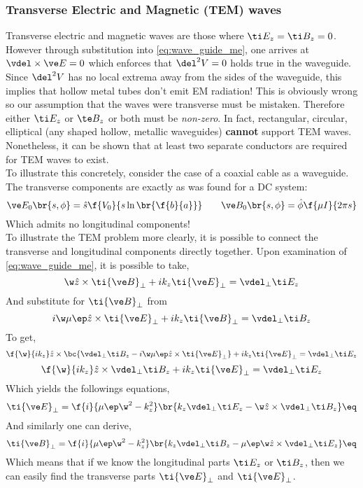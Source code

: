 \documentclass{article}
\begin{document}
\subsubsection{Transverse Electric and Magnetic (TEM) waves}

Transverse electric and magnetic waves are those where $\ti E_z = \ti B_z = 0$. However through substitution into \cref{eq:wave_guide_me}, one arrives at $\vdel \times \ve E = 0$ which enforces that $\del^2 V = 0$ holds true in the waveguide. Since $\del^2 V$ has no local extrema away from the sides of the waveguide, this implies that hollow metal tubes don't emit EM radiation! This is obviously wrong so our assumption that the waves were transverse must be mistaken. Therefore either $\ti E_z$ or $\te B_z$ or both must be \textit{non-zero}. In fact, rectangular, circular, elliptical (any shaped hollow, metallic waveguides) \textbf{cannot} support TEM waves. Nonetheless, it can be shown that at least two separate conductors are required for TEM waves to exist. \\

To illustrate this concretely, consider the case of a coaxial cable as a waveguide. The transverse components are exactly as was found for a DC system:
\[ \ve E_{0}\br{s, \phi} = \hat s \f{V_0}{s \ln \br{\f{b}{a}}} \qquad \ve B_{0}\br{s, \phi} = \hat \phi \f{\mu I}{2 \pi s} \]
Which admits no longitudinal components!\\

To illustrate the TEM problem more clearly, it is possible to connect the transverse and longitudinal components directly together. Upon examination of \cref{eq:wave_guide_me}, it is possible to take,
\[ \w \hat z \times \ti{\ve B}_{\perp} + i k_z \ti {\ve E}_{\perp} = \vdel_{\perp} \ti E_z \]
And substitute for $\ti{\ve B}_{\perp}$ from
\[ i \w \mu \ep \hat z \times \ti{\ve E}_{\perp} + i k_z \ti {\ve B}_{\perp} = \vdel_{\perp} \ti B_z \]
To get,
\[ \f{\w}{i k_z} \hat z \times \bc{\vdel_{\perp} \ti B_z - i \w \mu \ep \hat z \times \ti{\ve E}_{\perp}} + i k_z \ti {\ve E}_{\perp} = \vdel_{\perp} \ti E_z \]
\[ \f{\w}{i k_z} \hat z \times \vdel_{\perp} \ti B_z + i k_z \ti {\ve E}_{\perp} = \vdel_{\perp} \ti E_z \]
Which yields the followings equations,
\[ \ti {\ve E}_{\perp} = \f{i}{\mu \ep \w^2 - k_z^2} \br{k_z \vdel_{\perp} \ti E_{z} - \w \hat z \times \vdel_{\perp} \ti B_z} \eq \label{eq:long_from_trans_1} \]
And similarly one can derive,
\[ \ti {\ve B}_{\perp} = \f{i}{\mu \ep \w^2 - k_z^2} \br{k_z \vdel_{\perp} \ti B_{z} - \mu \ep \w \hat z \times \vdel_{\perp} \ti E_z} \eq \label{eq:long_from_trans_2} \]
Which means that if we know the longitudinal parts $\ti E_z$ or $\ti B_z$, then we can easily find the transverse parts $\ti {\ve E}_{\perp}$ and $\ti {\ve E}_{\perp}$. \\
\end{document}
